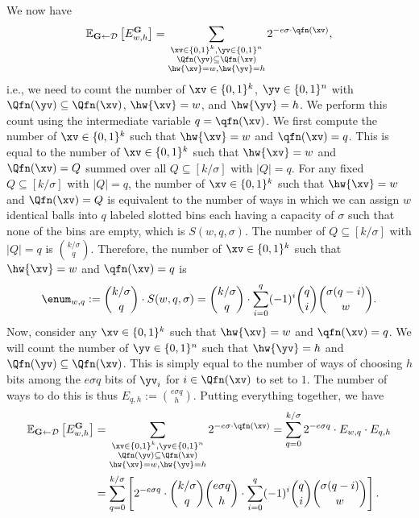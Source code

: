 \noindent We now have$$
\mathbb{E}_{\mathbf{G} \gets \mathcal{D}}\left[E^{\mathbf{G}}_{w,h}\right]=\sum_{\substack{\xv\in \{0,1\}^k, \yv \in \{0,1\}^n\\\Qfn(\yv) \subseteq \Qfn(\xv)\\\hw{\xv} = w,\hw{\yv} = h}}2^{-e\sigma\cdot\qfn(\xv)},$$
i.e., we need to count the number of $\xv\in \{0,1\}^k$, $\yv \in \{0,1\}^n$ with $\Qfn(\yv) \subseteq \Qfn(\xv)$, $\hw{\xv} = w$, and $\hw{\yv} = h$. We perform this count using the intermediate variable $q = \qfn(\xv)$. We first compute the number of $\xv \in \{0,1\}^{k}$ such that $\hw{\xv} = w$ and $\qfn(\xv) = q$. This is equal to the number of $\xv \in \{0,1\}^{k}$ such that $\hw{\xv} = w$ and $\Qfn(\xv) = Q$ summed over all $Q \subseteq [k/\sigma]$ with $|Q| = q$. For any fixed $Q \subseteq [k/\sigma]$ with $|Q| = q$, the number of $\xv \in \{0,1\}^{k}$ such that $\hw{\xv} = w$ and $\Qfn(\xv) = Q$ is equivalent to the number of ways in which we can assign $w$ identical balls into $q$ labeled slotted bins each having a capacity of $\sigma$ such that none of the bins are empty, which is $S(w,q,\sigma)$. The number of $Q \subseteq [k/\sigma]$ with $|Q| = q$ is ${k/\sigma \choose q}$. Therefore, the number of $\xv \in \{0,1\}^{k}$ such that $\hw{\xv} = w$ and $\qfn(\xv) = q$ is 
$$
\enum_{w,q}  := {k/\sigma \choose q}\cdot S(w,q, \sigma) = {k/\sigma \choose q}\cdot\sum_{i=0}^q (-1)^i {q \choose i} {\sigma(q-i) \choose w}.$$
Now, consider any $\xv \in \{0,1\}^{k}$ such that $\hw{\xv} = w$ and $\qfn(\xv) = q$. We will count the number of $\yv \in \{0,1\}^n$ such that $\hw{\yv} = h$ and $\Qfn(\yv) \subseteq \Qfn(\xv)$. This is simply equal to the number of ways of choosing $h$ bits among the $e\sigma q$ bits of $\yv_i$ for $i\in \Qfn(\xv)$ to set to $1$. The number of ways to do this is thus $
E_{q,h} := {e\sigma q \choose h }.$
Putting everything together, we have
\begin{align*}
\mathbb{E}_{\mathbf{G} \gets \mathcal{D}}\left[E^{\mathbf{G}}_{w,h}\right]&=\sum_{\substack{\xv \in \{0,1\}^k, \yv \in \{0,1\}^n\\\Qfn(\yv) \subseteq \Qfn(\xv)\\\hw{\xv} = w,\hw{\yv} = h}}2^{-e\sigma\cdot\qfn(\xv)} =\sum_{q=0}^{k/\sigma}2^{-e\sigma q} \cdot E_{w,q} \cdot E_{q,h}\\
&=\sum_{q=0}^{k/\sigma}\left[2^{-e\sigma q} \cdot{k/\sigma \choose q }{e\sigma q \choose h }\cdot\sum_{i=0}^q (-1)^i {q \choose i} {\sigma(q-i) \choose w}\right].
\end{align*}

